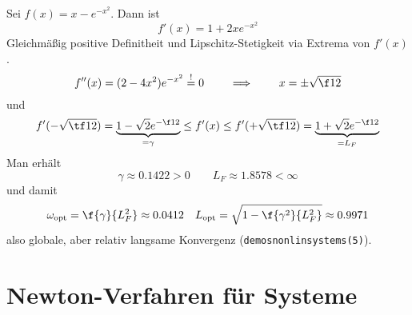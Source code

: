 \documentclass[11pt]{scrbook}
\begin{document}
\begin{st}
\begin{note}
\begin{itemize}
		\end{itemize}
	\end{note}
\end{st}

\begin{ex*}
	Sei $f(x) = x - e^{-x^2}$.
	Dann ist
	\[
		f'(x) = 1 + 2xe^{-x^2}
	\]
	Gleichmäßig positive Definitheit und Lipschitz-Stetigkeit via Extrema von $f'(x)$.	
	\[
		f''(x) = (2-4x^2)e^{-x^2} \stackrel != 0
		\qquad \implies \qquad
		x = \pm \sqrt{\f 12}
	\]
	und
	\begin{align*}
		f'(-\sqrt{\tf 12}) = \underbrace{1 - \sqrt 2 e^{-\f 12}}_{= \gamma} \le f'(x) \le f'(+\sqrt{\tf 12}) = \underbrace{1 + \sqrt 2 e^{- \f 12}}_{= L_F}
	\end{align*}
	Man erhält
	\[
		\gamma \approx 0.1422 > 0
		\qquad
		L_F \approx 1.8578 < \infty
	\]
	und damit
	\begin{align*}
		\omega_{\text{opt}} &= \f{\gamma}{L_F^2} \approx 0.0412 &
		L_{\text{opt}} = \sqrt{1- \f{\gamma^2}{L_F^2}} \approx 0.9971
	\end{align*}
	also globale, aber relativ langsame Konvergenz (\texttt{demos\textunderscore nonlin\textunderscore systems(5)}).
\end{ex*}


\section{Newton-Verfahren für Systeme}
\end{document}

